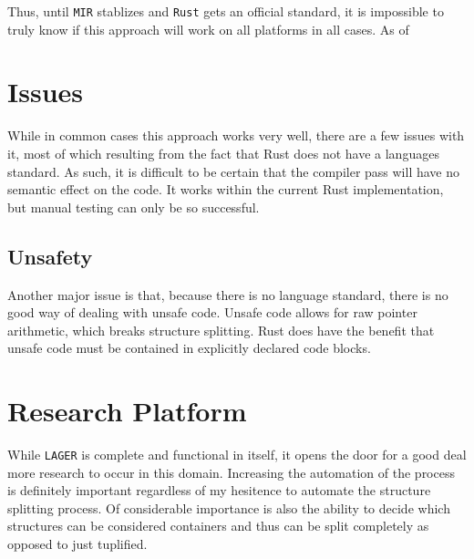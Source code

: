 \documentclass[12pt,oneside]{book}
\newcommand{\rustname}{{\texttt{Rust}}}
\def \rust {\rustname{}\xspace}
\newcommand{\mirname}{{\texttt{MIR}}}
\def \mir {\mirname{}\xspace}
\newcommand{\projectname}{{\texttt{LAGER}}}
\def \name{\projectname\xspace}
\begin{document}
Thus, until \mir stablizes and \rust gets an official standard, it is impossible
to truly know if this approach will work on all platforms in all cases. As of 

\chapter{Issues}

While in common cases this approach works very well, there are a few issues with
it, most of which resulting from the fact that Rust does not have a languages
standard. As such, it is difficult to be certain that the compiler pass will
have no semantic effect on the code. It works within the current Rust
implementation, but manual testing can only be so successful.


\section{Unsafety}
\label{sec:unsafe}


Another major issue is that, because there is no language standard, there is no
good way of dealing with unsafe code. Unsafe code allows for raw pointer
arithmetic, which breaks structure splitting. Rust does have the benefit that
unsafe code must be contained in explicitly declared code blocks.

\chapter{Research Platform}

While \name is complete and functional in itself, it opens the door for 
a good deal more research to occur in this domain. Increasing the automation
of the process is definitely important regardless of my hesitence to automate
the structure splitting process. Of considerable importance is also
the ability to decide which structures can be considered containers and thus 
can be split completely as opposed to just tuplified.



\end{document}

